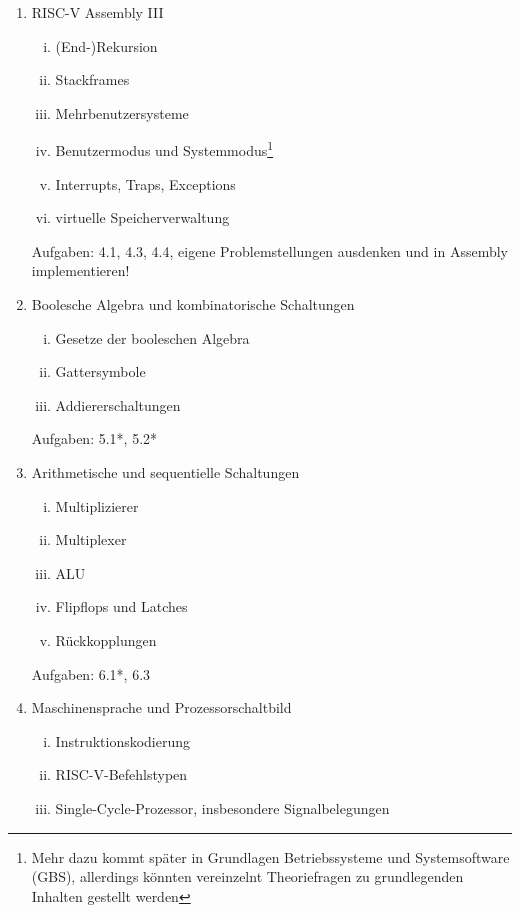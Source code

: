 \documentclass{article}
\begin{document}
\begin{enumerate}
          Aufgaben: 3.1*, 3.2*, 3.3
    \item RISC-V Assembly III
          \begin{enumerate}[i.]
              \item (End-)Rekursion
              \item Stackframes
              \item Mehrbenutzersysteme
              \item Benutzermodus und Systemmodus\footnote{Mehr dazu kommt später
              in Grundlagen Betriebssysteme und Systemsoftware (GBS), allerdings könnten
              vereinzelnt Theoriefragen zu grundlegenden Inhalten gestellt werden}
              \item Interrupts, Traps, Exceptions
              \item virtuelle Speicherverwaltung
          \end{enumerate}
          Aufgaben: 4.1, 4.3, 4.4, eigene Problemstellungen ausdenken und in Assembly implementieren!
    \item Boolesche Algebra und kombinatorische Schaltungen
          \begin{enumerate}[i.]
              \item Gesetze der booleschen Algebra
              \item Gattersymbole
              \item Addiererschaltungen
          \end{enumerate}
          Aufgaben: 5.1*, 5.2*
    \item Arithmetische und sequentielle Schaltungen
          \begin{enumerate}[i.]
              \item Multiplizierer
              \item Multiplexer
              \item ALU 
              \item Flipflops und Latches
              \item Rückkopplungen
          \end{enumerate}
          Aufgaben: 6.1*, 6.3
    \item Maschinensprache und Prozessorschaltbild
          \begin{enumerate}[i.]
              \item Instruktionskodierung
              \item RISC-V-Befehlstypen
              \item Single-Cycle-Prozessor, insbesondere Signalbelegungen

\end{enumerate}
\end{enumerate}
\end{document}
